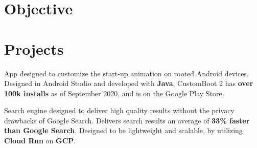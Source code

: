 \documentclass[letterpaper]{deedy-resume} %
\begin{document}
\begin{minipage}[t]{0.66\textwidth} %



\section{Objective}

\sectionspace %







\section{Projects}


App designed to customize the start-up animation on rooted Android devices. Designed in Android Studio and developed with \textbf{Java}, CustomBoot 2 has \textbf{over 100k installs} as of September 2020, and is on the Google Play Store.

\sectionspace %

Search engine designed to deliver high quality results without the privacy drawbacks of Google Search. Delivers search results an average of \textbf{33\% faster than Google Search}. Designed to be lightweight and scalable, by utilizing \textbf{Cloud Run} on \textbf{GCP}.

\sectionspace %



\end{minipage}
\end{document}
